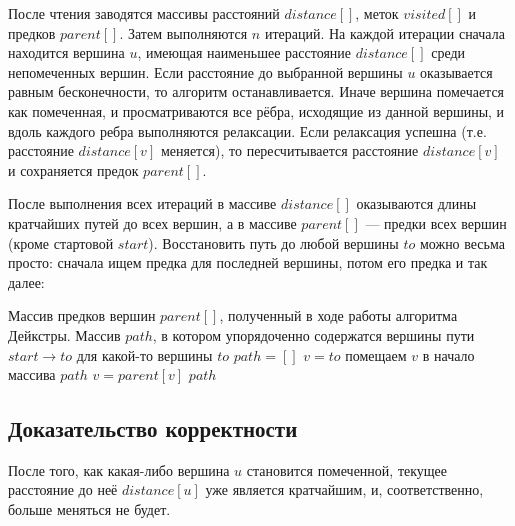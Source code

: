 \documentclass[a4paper,12pt]{article}
\begin{document}
После чтения заводятся массивы расстояний $distance[]$, меток $visited[]$ и предков $parent[]$. Затем выполняются $n$ итераций. На каждой итерации сначала находится вершина $u$, имеющая наименьшее расстояние $distance[]$ среди непомеченных вершин. Если расстояние до выбранной вершины $u$ оказывается равным бесконечности, то алгоритм останавливается. Иначе вершина помечается как помеченная, и просматриваются все рёбра, исходящие из данной вершины, и вдоль каждого ребра выполняются релаксации. Если релаксация успешна (т.е. расстояние $distance[v]$ меняется), то пересчитывается расстояние $distance[v]$ и сохраняется предок $parent[]$.

После выполнения всех итераций в массиве $distance[]$ оказываются длины кратчайших путей до всех вершин, а в массиве $parent[]$ — предки всех вершин (кроме стартовой $start$). Восстановить путь до любой вершины $to$ можно весьма просто: сначала ищем предка для последней вершины, потом его предка и так далее:

\begin{algorithm}
  	\caption{($parent[]$)}
	\begin{algorithmic}
	    \Require Массив предков вершин $parent[]$, полученный в ходе работы алгоритма Дейкстры.
	    \Ensure Массив $path$, в котором упорядоченно содержатся вершины пути $start \to to$ для какой-то вершины $to$
	    \State 
	    \State $path = []$
	    \State $v = to$
	        \State помещаем $v$ в начало массива $path$
	        \State $v = parent[v]$
	   \EndWhile
	   \Return $path$
	\end{algorithmic}
\end{algorithm}

\subsection{Доказательство корректности}

\begin{statement}
После того, как какая-либо вершина $u$ становится помеченной, текущее расстояние до неё $distance[u]$ уже является кратчайшим, и, соответственно, больше меняться не будет.
\end{statement} 
\end{document}
